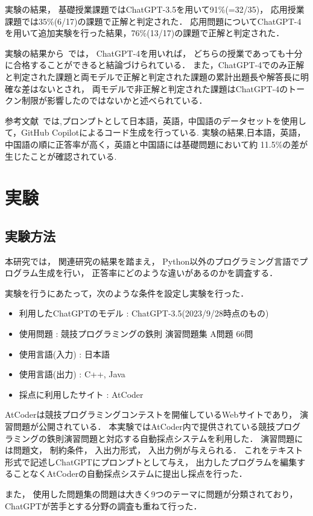 \documentclass[a4j,twocolumn,9pt]{jarticle}
\begin{document}
実験の結果， 基礎授業課題ではChatGPT-3.5を用いて91\%(=32/35)， 応用授業課題では35\%(6/17)の課題で正解と判定された． 
応用問題についてChatGPT-4を用いて追加実験を行った結果，76\%(13/17)の課題で正解と判定された． 

実験の結果から~\cite{Suzuki2023}では， ChatGPT-4を用いれば， どちらの授業であっても十分に合格することができると結論づけられている． 
また，ChatGPT-4でのみ正解と判定された課題と両モデルで正解と判定された課題の累計出題長や解答長に明確な差はないとされ， 両モデルで非正解と判定された課題はChatGPT-4のトークン制限が影響したのではないかと述べられている．

参考文献~\cite{Koyanagi2024}では,プロンプトとして日本語，英語，中国語のデータセットを使用して，GitHub Copilotによるコード生成を行っている.
実験の結果,日本語，英語，中国語の順に正答率が高く，英語と中国語には基礎問題において約 11.5\%の差が生じたことが確認されている.

\section{実験}
\subsection{実験方法}
本研究では， 関連研究の結果を踏まえ， Python以外のプログラミング言語でプログラム生成を行い， 正答率にどのような違いがあるのかを調査する．

実験を行うにあたって，次のような条件を設定し実験を行った．
\begin{itemize}
\item 利用したChatGPTのモデル : ChatGPT-3.5(2023/9/28時点のもの)
\item 使用問題 : 競技プログラミングの鉄則 演習問題集 A問題 66問
\item 使用言語(入力) : 日本語
\item 使用言語(出力) : C++, Java
\item 採点に利用したサイト : AtCoder
\end{itemize}

AtCoderは競技プログラミングコンテストを開催しているWebサイトであり， 演習問題が公開されている． 
本実験ではAtCoder内で提供されている競技プログラミングの鉄則演習問題と対応する自動採点システムを利用した．
演習問題には問題文， 制約条件， 入出力形式， 入出力例が与えられる．
これをテキスト形式で記述しChatGPTにプロンプトとして与え， 出力したプログラムを編集することなくAtCoderの自動採点システムに提出し採点を行った．

また， 使用した問題集の問題は大きく9つのテーマに問題が分類されており，ChatGPTが苦手とする分野の調査も重ねて行った． 
\end{document}
